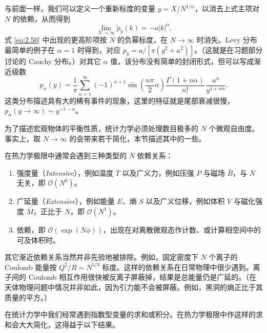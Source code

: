 与前面一样，我们可以定义一个重新标度的变量 $y=X/N^{1/\alpha}$，以消去上式主项对 $N$ 的依赖，从而得到
\begin{equation}\label{eq:2.51}
  \lim_{N\to\infty}\tilde p_y(k)=-a|k|^{\alpha}.
\end{equation}
式 \eqref{eq:2.50} 中出现的更高阶项按 $N$ 的负幂标度，在 $N\to\infty$ 时消失。Levy 分布最简单的例子在 $\alpha=1$ 时得到，对应 $p_y=a/[\pi(y^2+a^2)]$。（这就是在习题部分讨论的 Cauchy 分布。）对其它 $\alpha$ 值，该分布没有简单的封闭形式，但可以写成渐近级数
\begin{equation}\label{eq:2.52}
  p_{\alpha}(y)=\frac{1}{\pi}\sum_{n=1}^{\infty}(-1)^{n+1}\sin\left(\frac{n\pi}{2}\alpha\right)\frac{\Gamma(1+n\alpha)}{n!}\,\frac{a^n}{y^{1+n\alpha}}.
\end{equation}
这类分布描述具有大的稀有事件的现象，这里的特征就是尾部衰减很慢，$p_{\alpha}(y\to\infty)\sim y^{-1-\alpha}$。


为了描述宏观物体的平衡性质，统计力学必须处理数目极多的 $N$ 个微观自由度。事实上，取 $N\to\infty$ 的会带来若干简化，本节描述其中的一些。

在热力学极限中通常会遇到三种类型的 $N$ 依赖关系：

\begin{enumerate}[label=(\alph*),itemsep=0.3em,topsep=0.4em]
  \item 强度量（\textit{Intensive}），例如温度 $T$ 以及广义力，例如压强 $P$ 与磁场 $\bar B$，与 $N$ 无关，即 $\mathcal{O}(N^0)$。
  \item 广延量（\textit{Extensive}），例如能量 $E$、熵 $S$ 以及广义位移，例如体积 $V$ 与磁化强度 $\bar M$，正比于 $N$，即 $\mathcal{O}(N^1)$。
  \item {}依赖，即 $\mathcal{O}(\exp(N\phi))$，出现在对离散微观态作计数、或计算相空间中的可及体积时。
\end{enumerate}

其它渐近依赖关系当然并非先验地被排除。例如，固定密度下 $N$ 个离子的 Coulomb 能量按 $Q^2/R\sim N^{5/3}$ 标度。这样的依赖关系在日常物理中很少遇到。离子间的 Coulomb 相互作用很快被反离子屏蔽掉，结果是总能量仍是广延的。（在天体物理问题中情况并非如此，因为引力能不会被屏蔽。例如，黑洞的熵正比于其质量的平方。）

在统计力学中我们经常遇到指数型变量的求和或积分。在热力学极限中作这样的求和会大大简化，这得益于以下结果。

